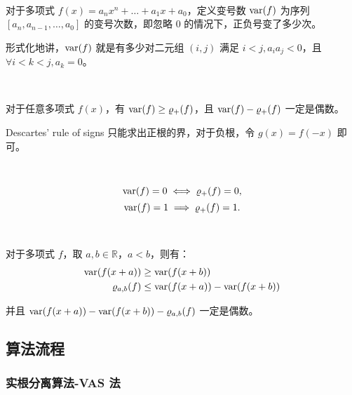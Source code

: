 \begin{definition}[多项式的变号数]~

	对于多项式 $f(x) = a_n x^n + \dots + a_1 x + a_0$，定义变号数 $\mathrm{var}(f)$ 为序列 $[a_n, a_{n-1}, \dots, a_0]$ 的变号次数，即忽略 $0$ 的情况下，正负号变了多少次。

	形式化地讲，$\mathrm{var}(f)$ 就是有多少对二元组 $(i, j)$ 满足 $i < j, a_i a_j < 0$，且 $\forall i < k < j, a_k = 0$。

	
\end{definition}

\begin{theorem}~

	对于任意多项式 $f(x)$，有 $\mathrm{var}(f) \geq \varrho_+(f)$，且 $\mathrm{var}(f) - \varrho_+(f)$ 一定是偶数。

	
\end{theorem}

Descartes' rule of signs 只能求出正根的界，对于负根，令 $g(x) = f(-x)$ 即可。

\begin{theorem}[]~

	$$\mathrm{var}(f) = 0 \iff \varrho_+(f) = 0,$$
	$$\mathrm{var}(f) = 1 \implies \varrho_+(f) = 1.$$


\end{theorem}

\begin{theorem}~

	对于多项式 $f$，取 $a, b \in \mathbb{R}$，$a < b$，则有：
	$$
	\begin{aligned}
		\mathrm{var}(f(x + a)) & \geq \mathrm{var}(f(x + b)) \\
		\varrho_{a, b} (f) & \leq \mathrm{var}(f(x + a)) - \mathrm{var}(f(x + b)) \\
	\end{aligned}
	$$

	并且 $\mathrm{var}(f(x + a)) - \mathrm{var}(f(x + b)) - \varrho_{a, b} (f)$ 一定是偶数。

	
\end{theorem}

\subsection{算法流程}

\subsubsection{实根分离算法-VAS 法}

